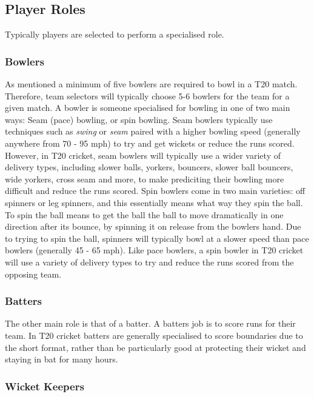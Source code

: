 \documentclass[12pt,a4paper]{report}
\theoremstyle{definition}
\begin{document}
\subsection{Player Roles}

Typically players are selected to perform a specialised role.

\subsubsection{Bowlers}

As mentioned a minimum of five bowlers are required to bowl in a T20 match.  
Therefore, team selectors will typically choose 5-6 bowlers for the team for a given match.
A bowler is someone specialised for bowling in one of two main ways: Seam (pace) bowling, or spin bowling.
Seam bowlers typically use techniques such as \emph{swing} or \emph{seam} paired with a higher bowling speed (generally anywhere from 70 - 95 mph) to try and get wickets or reduce the runs scored.
However, in T20 cricket, seam bowlers will typically use a wider variety of delivery types, including slower balls, yorkers, bouncers, slower ball bouncers, wide yorkers, cross seam and more, to make prediciting their bowling more difficult and reduce the runs scored. 
Spin bowlers come in two main varieties: off spinners or leg spinners, and this essentially means what way they spin the ball. 
To spin the ball means to get the ball the ball to move dramatically in one direction after its bounce, by spinning it on release from the bowlers hand.
Due to trying to spin the ball, spinners will typically bowl at a slower speed than pace bowlers (generally 45 - 65 mph).
Like pace bowlers, a spin bowler in T20 cricket will use a variety of delivery types to try and reduce the runs scored from the opposing team.

\subsubsection{Batters}

The other main role is that of a batter.
A batters job is to score runs for their team.
In T20 cricket batters are generally specialised to score boundaries due to the short format, rather than be particularly good at protecting their wicket and staying in bat for many hours.

\subsubsection{Wicket Keepers}
\end{document}
